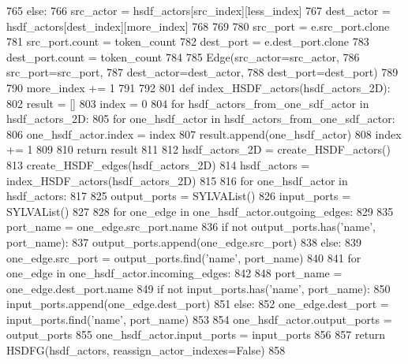 \begin{DoxyCode}
765                         \textcolor{keywordflow}{else}:
766                             src\_actor = hsdf\_actors[src\_index][less\_index]
767                             dest\_actor = hsdf\_actors[dest\_index][more\_index]
768 
769                         
780                         src\_port = e.src\_port.clone
781                         src\_port.count = token\_count
782                         dest\_port = e.dest\_port.clone
783                         dest\_port.count = token\_count
784 
785                         Edge(src\_actor=src\_actor,
786                              src\_port=src\_port,
787                              dest\_actor=dest\_actor,
788                              dest\_port=dest\_port)
789 
790                         more\_index += 1
791 
792         
801         \textcolor{keyword}{def }index\_HSDF\_actors(hsdf\_actors\_2D):
802             result = []
803             index = 0
804             \textcolor{keywordflow}{for} hsdf\_actors\_from\_one\_sdf\_actor \textcolor{keywordflow}{in} hsdf\_actors\_2D:
805                 \textcolor{keywordflow}{for} one\_hsdf\_actor \textcolor{keywordflow}{in} hsdf\_actors\_from\_one\_sdf\_actor:
806                     one\_hsdf\_actor.index = index
807                     result.append(one\_hsdf\_actor)
808                     index += 1
809 
810             \textcolor{keywordflow}{return} result
811 
812         hsdf\_actors\_2D = create\_HSDF\_actors()
813         create\_HSDF\_edges(hsdf\_actors\_2D)
814         hsdf\_actors = index\_HSDF\_actors(hsdf\_actors\_2D)
815 
816         \textcolor{keywordflow}{for} one\_hsdf\_actor \textcolor{keywordflow}{in} hsdf\_actors:
817             
825             output\_ports = SYLVAList()
826             input\_ports = SYLVAList()
827 
828             \textcolor{keywordflow}{for} one\_edge \textcolor{keywordflow}{in} one\_hsdf\_actor.outgoing\_edges:
829                 
835                 port\_name = one\_edge.src\_port.name
836                 \textcolor{keywordflow}{if} \textcolor{keywordflow}{not} output\_ports.has(\textcolor{stringliteral}{'name'}, port\_name):
837                     output\_ports.append(one\_edge.src\_port)
838                 \textcolor{keywordflow}{else}:
839                     one\_edge.src\_port = output\_ports.find(\textcolor{stringliteral}{'name'}, port\_name)
840 
841             \textcolor{keywordflow}{for} one\_edge \textcolor{keywordflow}{in} one\_hsdf\_actor.incoming\_edges:
842                 
848                 port\_name = one\_edge.dest\_port.name
849                 \textcolor{keywordflow}{if} \textcolor{keywordflow}{not} input\_ports.has(\textcolor{stringliteral}{'name'}, port\_name):
850                     input\_ports.append(one\_edge.dest\_port)
851                 \textcolor{keywordflow}{else}:
852                     one\_edge.dest\_port = input\_ports.find(\textcolor{stringliteral}{'name'}, port\_name)
853 
854             one\_hsdf\_actor.output\_ports = output\_ports
855             one\_hsdf\_actor.input\_ports = input\_ports
856 
857         \textcolor{keywordflow}{return} HSDFG(hsdf\_actors, reassign\_actor\_indexes=\textcolor{keyword}{False})
858 \end{DoxyCode}


